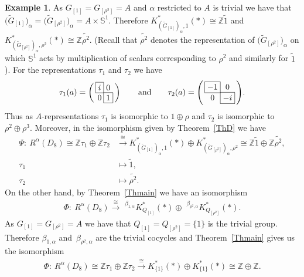 \documentclass[10pt,a4paper]{amsart}
\def\Z{\mathbb{Z}}
\def\S{\mathbb{S}}
\theoremstyle{definition}
\newtheorem{Ex}[Th]{Example}
\numberwithin{equation}{section}
\begin{document}
\begin{Ex}
As $G_{[1]}=G_{[\rho^{2}]}=A$ and $\alpha$ restricted to $A$ is trivial we have that
$\big(\widetilde{G}_{[1]}\big)_{\alpha}=\big(\widetilde{G}_{[\rho^{2}]}\big)_{\alpha}=A\times \S^{1}$.
Therefore $K^{\ast}_{(\widetilde{G}_{[1]})_{\alpha},1}(\ast)\cong \Z\tilde{1}$ and
$K^{\ast}_{(\widetilde{G}_{[\rho^{2}]})_{\alpha},\rho^{2}}(\ast)\cong \Z\tilde{\rho^{2}}$.
(Recall that $\tilde{\rho^{2}}$ denotes the representation of
$\big(\widetilde{G}_{[\rho^{2}]}\big)_{\alpha}$ on which $\S^{1}$ acts by multiplication of
scalars corresponding to $\rho^{2}$ and similarly for $\tilde{1}$).
For the representations $\tau_{1}$ and $\tau_{2}$ we have
 \begin{gather*}
 \arraycolsep=-.05ex
\tau_{1}(a)=
\left(\,\begin{matrix}
 \fbox{$i$} &0 \\[-.2ex]
 0 &\fbox{1}
 \end{matrix}\,\right) \qquad\text{and}\qquad
\tau_{2}(a)=
\left(\,\begin{matrix}
 \fbox{$-1$} &0 \\[-.2ex]
 0 & \fbox{$-i$}
 \end{matrix}\,\right)\!.
 \end{gather*}
Thus as $A$-representations $\tau_{1}$ is isomorphic to $1\oplus \rho$ and
$\tau_{2}$ is isomorphic to $\rho^{2}\oplus\rho^{3}$.
Moreover, in the isomorphism given by Theorem~\ref{ThD} we have
\begin{align*}
\Psi\colon\ R^{\alpha}(D_{8})\cong \Z\tau_{1}\oplus\Z\tau_{2}
&\stackrel{\cong}{\rightarrow} K^{\ast}_{(\widetilde{G}_{[1]})_{\alpha},1}(\ast)\oplus
K^{\ast}_{(\widetilde{G}_{[\rho^{2}]})_{\alpha},\rho^{2}}\cong
\Z{\tilde{1}}\oplus \Z\tilde{\rho^{2}},
\\
\tau_{1}&\mapsto \tilde{1},
\\
\tau_{2}&\mapsto \tilde{\rho^{2}}.
\end{align*}
On the other hand, by Theorem~\ref{Thmain} we have an isomorphism
\begin{gather*}
\Phi\colon\ R^{\alpha}(D_{8})\stackrel{\cong }{\rightarrow} \phantom{i}
^{\beta_{1,\alpha}}K^{\ast}_{Q_{[1]}}(\ast)\oplus \phantom{i}
^{\beta_{\rho^{2},\alpha}}K^{\ast}_{Q_{[\rho^{2}]}}(\ast).
\end{gather*}
As $G_{[1]}=G_{[\rho^{2}]}=A$ we have that $Q_{[1]}=Q_{[\rho^{2}]}=\{1\}$ is the
trivial group. Therefore $\beta_{1,\alpha}$ and~$\beta_{\rho^{2},\alpha}$ are
the trivial cocycles and Theorem~\ref{Thmain} gives us the isomorphism
\begin{gather*}
\Phi\colon\ R^{\alpha}(D_{8})\cong \Z\tau_{1}\oplus\Z\tau_{2} \stackrel{\cong}{\rightarrow}
K^{\ast}_{\{1\}}(\ast)\oplus K^{\ast}_{\{1\}}(\ast)\cong \Z\oplus \Z.
\end{gather*}
\end{Ex}
\end{document}
